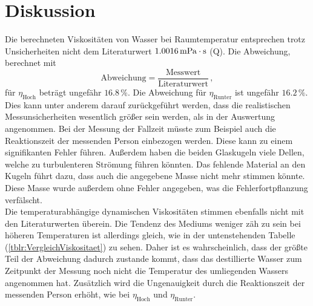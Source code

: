 \section{Diskussion}
\label{sec:Diskussion}
Die berechneten Viskositäten von Wasser bei Raumtemperatur entsprechen trotz Unsicherheiten nicht
dem Literaturwert $1.0016 \,\unit[inter-unit-product=\cdot]{\milli\pascal\second}$ (Q\cite{wasserVisk}). Die Abweichung, berechnet mit 
\begin{equation}
  \text{Abweichung}= \frac{\text{Messwert}}{\text{Literaturwert}}\, , 
\end{equation}
 für $\eta_{\text{Hoch}}$ 
beträgt ungefähr $16.8 \,\%$. Die Abweichung für $\eta_{\text{Runter}}$ ist ungefähr $16.2 \,\%$. \\ 
Dies kann unter anderem darauf zurückgeführt werden, 
dass die realistischen Messunsicherheiten wesentlich größer sein werden, als in der Auswertung angenommen. Bei der Messung der Fallzeit müsste zum Beispiel auch die 
Reaktionszeit der messenden Person einbezogen werden. Diese kann zu einem signifikanten Fehler führen. Außerdem haben die beiden Glaskugeln viele Dellen, welche 
zu turbulenteren Strömung führen könnten. Das fehlende Material an den Kugeln führt dazu, dass auch die angegebene Masse nicht mehr stimmen könnte. Diese Masse wurde 
außerdem ohne Fehler angegeben, was die Fehlerfortpflanzung verfälscht. 
\\
Die temperaturabhängige dynamischen Viskositäten stimmen ebenfalls nicht mit den Literaturwerten überein. Die Tendenz des Mediums weniger zäh 
zu sein bei höheren Temperaturen ist allerdings gleich, wie in der untenstehenden Tabelle (\ref{tblr:VergleichViskositaet}) zu sehen. Daher ist es wahrscheinlich, dass der größte Teil der Abweichung dadurch zustande kommt, 
dass das destillierte Wasser zum Zeitpunkt der Messung noch nicht die Temperatur des umliegenden Wassers angenommen hat. Zusätzlich wird die Ungenauigkeit
durch die Reaktionszeit der messenden Person erhöht, wie bei $\eta_{\text{Hoch}}$ und $\eta_{\text{Runter}}$. 
 \\
